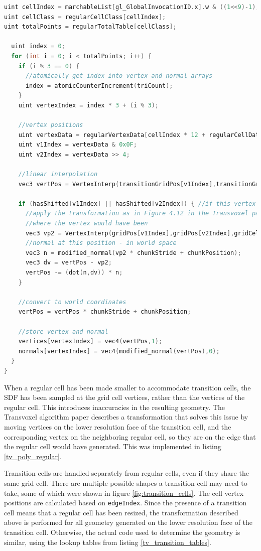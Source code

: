 \documentclass[11pt]{article}
\begin{document}
\begin{enumerate}
\begin{lstlisting}[language=C++,label={tv_poly_regular},caption={Code for generating the geometry in a regular cell.}]
uint cellIndex = marchableList[gl_GlobalInvocationID.x].w & ((1<<9)-1);
uint cellClass = regularCellClass[cellIndex];
uint totalPoints = regularTotalTable[cellClass];

  uint index = 0;
  for (int i = 0; i < totalPoints; i++) {
    if (i % 3 == 0) {
      //atomically get index into vertex and normal arrays
      index = atomicCounterIncrement(triCount);
    }
    uint vertexIndex = index * 3 + (i % 3);

    //vertex positions
    uint vertexData = regularVertexData[cellIndex * 12 + regularCellData[cellClass * 16 + 1+i]];
    uint v1Index = vertexData & 0x0F;
    uint v2Index = vertexData >> 4;

    //linear interpolation
    vec3 vertPos = VertexInterp(transitionGridPos[v1Index],transitionGridPos[v2Index],gridCells[v1Index],gridCells[v2Index]);

    if (hasShifted[v1Index] || hasShifted[v2Index]) { //if this vertex has moved
      //apply the transformation as in Figure 4.12 in the Transvoxel paper
      //where the vertex would have been
      vec3 vp2 = VertexInterp(gridPos[v1Index],gridPos[v2Index],gridCells[v1Index], gridCells[v2Index]);
      //normal at this position - in world space
      vec3 n = modified_normal(vp2 * chunkStride + chunkPosition);
      vec3 dv = vertPos - vp2;
      vertPos -= (dot(n,dv)) * n;
    }

    //convert to world coordinates
    vertPos = vertPos * chunkStride + chunkPosition;

    //store vertex and normal
    vertices[vertexIndex] = vec4(vertPos,1);
    normals[vertexIndex] = vec4(modified_normal(vertPos),0);
  }
}
\end{lstlisting}
When a regular cell has been made smaller to accommodate transition cells, the SDF has been sampled at the grid cell vertices, rather than the vertices of the regular cell. This introduces inaccuracies in the resulting geometry. The Transvoxel algorithm paper describes a transformation that solves this issue by moving vertices on the lower resolution face of the transition cell, and the corresponding vertex on the neighboring regular cell, so they are on the edge that the regular cell would have generated. This was implemented in listing \ref{tv_poly_regular}.

Transition cells are handled separately from regular cells, even if they share the same grid cell. There are multiple possible shapes a transition cell may need to take, some of which were shown in figure \ref{fig:transition_cells}. The cell vertex positions are calculated based on \texttt{edgeIndex}. Since the presence of a transition cell means that a regular cell has been resized, the transformation described above is performed for all geometry generated on the lower resolution face of the transition cell. Otherwise, the actual code used to determine the geometry is similar, using the lookup tables from listing \ref{tv_transition_tables}.


\end{enumerate}
\end{document}
